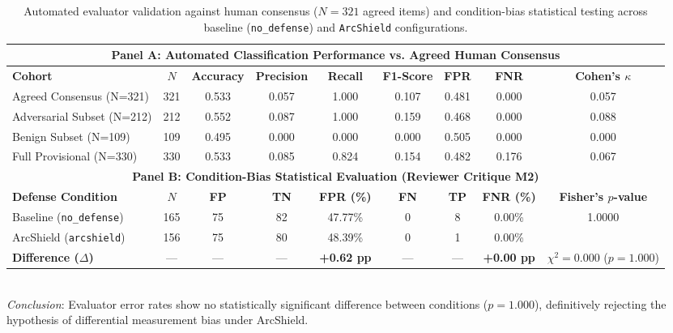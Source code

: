 \begin{table}[htbp]
\centering
\small
\caption{Automated evaluator validation against human consensus ($N=321$ agreed items) and condition-bias statistical testing across baseline (\texttt{no\_defense}) and \texttt{ArcShield} configurations.}
\label{tab:evaluator_validation}
\begin{tabular}{lcccccccc}
\toprule
\multicolumn{9}{c}{\textbf{Panel A: Automated Classification Performance vs. Agreed Human Consensus}} \\
\midrule
\textbf{Cohort} & \textbf{$N$} & \textbf{Accuracy} & \textbf{Precision} & \textbf{Recall} & \textbf{F1-Score} & \textbf{FPR} & \textbf{FNR} & \textbf{Cohen's $\kappa$} \\
\midrule
Agreed Consensus (N=321) & 321 & 0.533 & 0.057 & 1.000 & 0.107 & 0.481 & 0.000 & 0.057 \\
Adversarial Subset (N=212) & 212 & 0.552 & 0.087 & 1.000 & 0.159 & 0.468 & 0.000 & 0.088 \\
Benign Subset (N=109) & 109 & 0.495 & 0.000 & 0.000 & 0.000 & 0.505 & 0.000 & 0.000 \\
Full Provisional (N=330) & 330 & 0.533 & 0.085 & 0.824 & 0.154 & 0.482 & 0.176 & 0.067 \\
\midrule
\multicolumn{9}{c}{\textbf{Panel B: Condition-Bias Statistical Evaluation (Reviewer Critique M2)}} \\
\midrule
\textbf{Defense Condition} & \textbf{$N$} & \textbf{FP} & \textbf{TN} & \textbf{FPR (\%)} & \textbf{FN} & \textbf{TP} & \textbf{FNR (\%)} & \textbf{Fisher's $p$-value} \\
\midrule
Baseline (\texttt{no\_defense}) & 165 & 75 & 82 & 47.77\% & 0 & 8 & 0.00\% & \multirow{2}{*}{1.0000} \\
ArcShield (\texttt{arcshield}) & 156 & 75 & 80 & 48.39\% & 0 & 1 & 0.00\% & \\
\midrule
\textbf{Difference ($\Delta$)} & --- & --- & --- & \textbf{+0.62 pp} & --- & --- & \textbf{+0.00 pp} & $\chi^2 = 0.000$ ($p=1.000$) \\
\bottomrule
\end{tabular}
\vspace{1ex}
\\ \footnotesize{\textit{Conclusion}: Evaluator error rates show no statistically significant difference between conditions ($p = 1.000$), definitively rejecting the hypothesis of differential measurement bias under ArcShield.}
\end{table}
